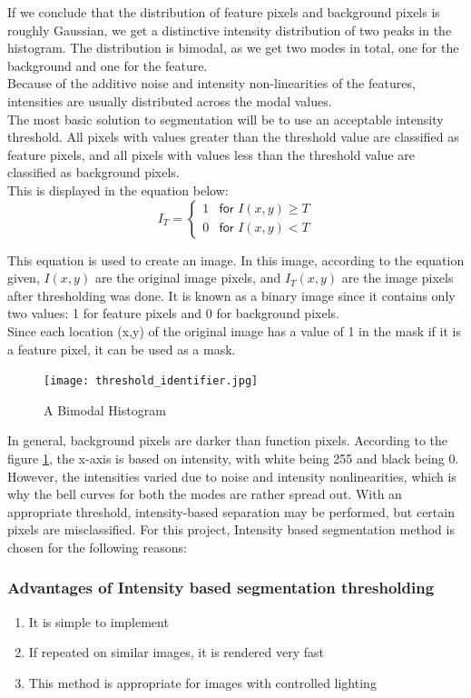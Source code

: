 \documentclass[a4paper]{report}
\begin{document}
If we conclude that the distribution of feature pixels and background pixels is roughly Gaussian, we get a distinctive intensity distribution of two peaks in the histogram.
The distribution is bimodal, as we get two modes in total, one for the background and one for the feature.
\\
Because of the additive noise and intensity non-linearities of the features, intensities are usually distributed across the modal values. 
\\
The most basic solution to segmentation will be to use an acceptable intensity threshold. All pixels with values greater than the threshold value are classified as feature pixels, and all pixels with values less than the threshold value are classified as background pixels.
\\
This is displayed in the equation below:
\begin{equation}
I_T = 
\begin{cases} 
      1 & \textsf{for } I(x,y) \geq T\\
      0 & \textsf{for } I(x,y) < T
   \end{cases}
\end{equation}

This equation is used to create an image. In this image, according to the equation given, \( I(x,y)\) are the original image pixels, and \(I_T(x,y)\) are the image pixels after thresholding was done. It is known as a binary image since it contains only two values: 1 for feature pixels and 0 for background pixels.
\\
Since each location (x,y) of the original image has a value of 1 in the mask if it is a feature pixel, it can be used as a mask.

\begin{figure}[h]
\texttt{[image: threshold\_identifier.jpg]} 
\caption{A Bimodal Histogram \cite{WWH}}
\label{fig:thresh}
\end{figure}

In general, background pixels are darker than function pixels.
According to the figure \ref{fig:thresh}, the x-axis is based on intensity, with white being 255 and black being 0. However, the intensities varied due to noise and intensity nonlinearities, which is why the bell curves for both the modes are rather spread out. With an appropriate threshold, intensity-based separation may be performed, but certain pixels are misclassified.
\newpage
For this project, Intensity based segmentation method is chosen for the following reasons:
\subsubsection{Advantages of Intensity based segmentation thresholding }
\begin{enumerate}
\item It is simple to implement
\item If repeated on similar images, it is rendered very fast
\item This method is appropriate for images with controlled lighting
\end{enumerate}
\end{document}

